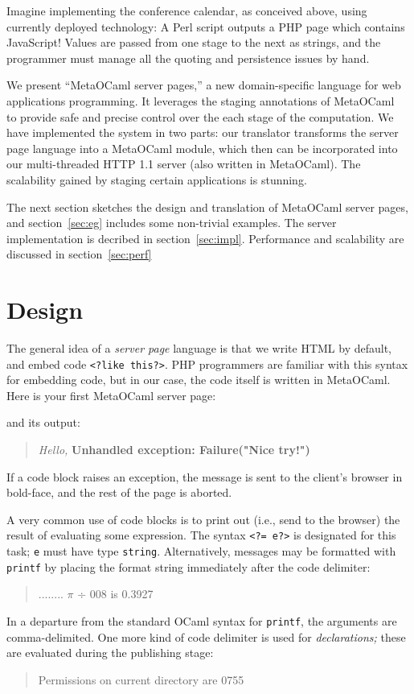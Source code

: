 \documentclass[preprint]{acm_proc_article-sp}
\def\MOC{MetaOCaml}
\begin{document}
Imagine implementing the conference calendar, as conceived
above, using currently deployed technology: A Perl script
outputs a PHP page which contains JavaScript!  Values are
passed from one stage to the next as strings, and the
programmer must manage all the quoting and persistence
issues by hand.

We present ``\MOC{} server pages,'' a new domain-specific
language for web applications programming.  It leverages the
staging annotations of \MOC~\cite{calcagno03meta,taha00metaml}
to provide safe and precise control over the each stage of the
computation.  We have implemented the system in two parts: our
translator transforms the server page language into a \MOC{}
module, which then can be incorporated into our multi-threaded
HTTP 1.1 server (also written in \MOC{}).  The scalability
gained by staging certain applications is stunning.

The next section sketches the design and translation of \MOC{}
server pages, and section~\ref{sec:eg} includes some non-trivial
examples.  The server implementation is decribed in
section~\ref{sec:impl}.  Performance and scalability are
discussed in section~\ref{sec:perf}

\section{Design}
\label{sec:design}

The general idea of a \emph{server page} language is that we
  write HTML by default, and embed code %
\lstinline{<?like this?>}.  %
PHP programmers are familiar with this syntax for embedding code, but
in our case, the code itself is written in \MOC.  Here is your first
\MOC{} server page:


and its output:
\begin{quote}
  \textit{Hello,} \textbf{Unhandled exception: Failure("Nice try!")}
\end{quote}
If a code block raises an exception, the message is sent to the
client's browser in bold-face, and the rest of the page is
aborted. 

\def\cd#1{\lstinline{#1}}
\def\id#1{\texttt{#1}}

A very common use of code blocks is to print out (i.e., send to
the browser) the result of evaluating some expression.  The
syntax \cd{<?= e?>} is designated for this task; \cd{e} must
have type \id{string}.  Alternatively, messages may be formatted
with \id{printf} by placing the format string immediately after
the code delimiter: 
\begin{quote}
  ........ $\pi$ ÷ 008 is 0.3927
\end{quote}
In a departure from the standard OCaml syntax for \id{printf}, the
arguments are comma-delimited.
One more kind of code delimiter is used for \emph{declarations;}
these are evaluated during the publishing stage:

\begin{quote}
Permissions on current directory are 0755
\end{quote}
\end{document}
